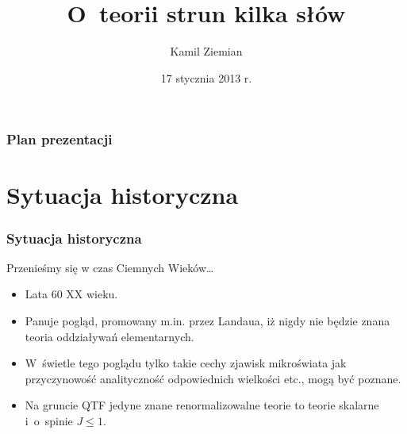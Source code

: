 \documentclass[10pt,t]{beamer}
\title{O~teorii strun kilka słów}
\author{Kamil Ziemian}
\institute{II rok, fizyka teoretyczna, studia magisterskie}
\date[17 I 2013]{17 stycznia 2013 r.}
\begin{document}






\RaggedRight





\maketitle %






\begin{frame}
  \frametitle{Plan prezentacji}


  \tableofcontents %

\end{frame}





\section{Sytuacja historyczna}



\begin{frame}
  \frametitle{Sytuacja historyczna}


  Przenieśmy się w czas Ciemnych Wieków\ldots
  \begin{itemize}
    \RaggedRight

  \item Lata 60 XX wieku.

  \item Panuje pogląd, promowany m.in. przez Landaua, iż nigdy nie
    będzie znana teoria oddziaływań elementarnych.

  \item W~świetle tego poglądu tylko takie cechy zjawisk mikroświata
    jak przyczynowość analityczność odpowiednich wielkości etc.,
    mogą być poznane.

  \item Na gruncie QTF jedyne znane renormalizowalne teorie to
    teorie skalarne i~o~spinie $J \leq 1$.

  \end{itemize}

\end{frame}
\end{document}
